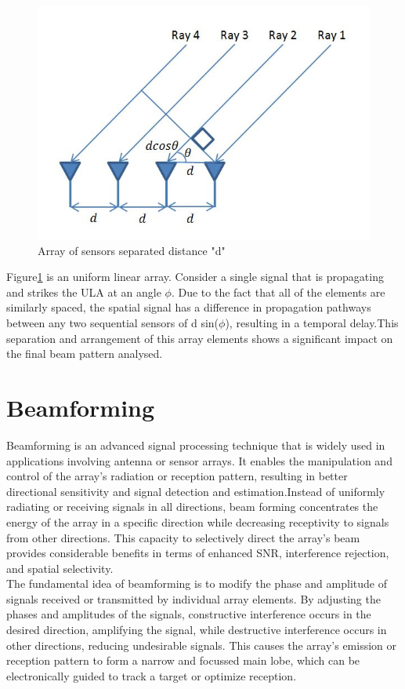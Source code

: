 \begin{figure}[h]
\centering
\includegraphics[scale=0.75]{Chapter2/Figures/array}		
\caption{ \label{fig:array}Array of sensors separated distance "d"}
\end{figure}
Figure\ref{fig:array} is an uniform linear array. Consider a single signal that is propagating and strikes the ULA at an angle $\phi$. Due to the fact that all of the elements are similarly spaced, the spatial signal has a difference in propagation pathways between any two sequential sensors of d sin($\phi$), resulting in a temporal delay.This separation and arrangement of  this array elements shows a significant impact on the final beam pattern analysed.
 
\section{Beamforming}
Beamforming is an advanced signal processing technique that is widely used in applications involving antenna or sensor arrays. It enables the manipulation and control of the array's radiation or reception pattern, resulting in better directional sensitivity and signal detection and estimation.Instead of uniformly radiating or receiving signals in all directions, beam forming concentrates the energy of the array in a specific direction while decreasing receptivity to signals from other directions. This capacity to selectively direct the array's beam provides considerable benefits in terms of enhanced SNR, interference rejection, and spatial selectivity.\\
The fundamental idea of beamforming is to modify the phase and amplitude of signals received or transmitted by individual array elements. By adjusting the phases and amplitudes of the signals, constructive interference occurs in the desired direction, amplifying the signal, while destructive interference occurs in other directions, reducing undesirable signals. This causes the array's emission or reception pattern to form a narrow and focussed main lobe, which can be electronically guided to track a target or optimize reception.\\
